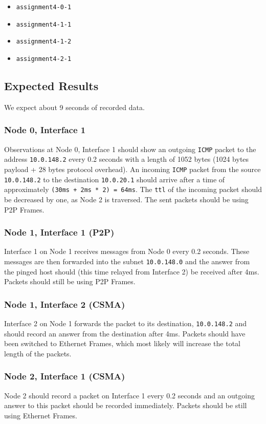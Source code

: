 \documentclass[parskip=full]{scrartcl}
\begin{document}
\begin{itemize}
    \item \texttt{assignment4-0-1}
    \item \texttt{assignment4-1-1}
    \item \texttt{assignment4-1-2}
    \item \texttt{assignment4-2-1}
\end{itemize}

\subsection{Expected Results}
We expect about 9 seconds of recorded data. 
\subsubsection{Node 0, Interface 1}
Observations at Node 0, Interface 1 should show an outgoing \texttt{ICMP} packet to the address \texttt{10.0.148.2} every 0.2 seconds with a length of 1052 bytes (1024 bytes payload + 28 bytes protocol overhead).
An incoming \texttt{ICMP} packet from the source \texttt{10.0.148.2} to the destination \texttt{10.0.20.1} should arrive after a time of approximately \texttt{(30ms + 2ms * 2) = 64ms}.
The \texttt{ttl} of the incoming packet should be decreased by one, as Node 2 is traversed.
The sent packets should be using P2P Frames. 

\subsubsection{Node 1, Interface 1 (P2P)}
Interface 1 on Node 1 receives messages from Node 0 every 0.2 seconds.
These messages are then forwarded into the subnet \texttt{10.0.148.0} and the answer from the pinged host should (this time relayed from Interface 2) be received after 4ms.
Packets should still be using P2P Frames.
\subsubsection{Node 1, Interface 2 (CSMA)}
Interface 2 on Node 1 forwards the packet to its destination, \texttt{10.0.148.2} and should record an answer from the destination after 4ms.
Packets should have been switched to Ethernet Frames, which most likely will increase the total length of the packets.
\subsubsection{Node 2, Interface 1 (CSMA)}
Node 2 should record a packet on Interface 1 every 0.2 seconds and an outgoing answer to this packet should be recorded immediately.
Packets should be still using Ethernet Frames.
\end{document}
